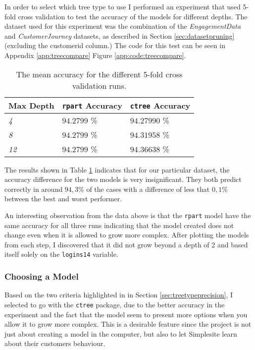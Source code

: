 In order to select which tree type to use I performed an experiment that used
5-fold cross validation\cite[p. 32]{bishop2006pattern} to test the accuracy of
the models for different depths. The dataset used for this experiment was the
combination of the \textit{EngagementData} and \textit{CustomerJourney}
datasets, as described in Section \ref{sec:datasetpruning} (excluding the
customerid column.) The code for this test can be seen in Appendix
\ref{app:treecompare} Figure \ref{app:code:treecompare}.

\begin{table}[H]
    \centering
    \begin{tabular}{l|l|l}
        \textbf{Max Depth} & \textbf{\texttt{rpart} Accuracy} & \textbf{\texttt{ctree} Accuracy} \\ \hline
        \textit{4}         & $94.2799$ \%                     & $94.27990$ \%                    \\
        \textit{8}         & $94.2799$ \%                     & $94.31958$ \%                    \\
        \textit{12}        & $94.2799$ \%                     & $94.36638$ \%
    \end{tabular}
    \caption{The mean accuracy for the different 5-fold cross validation runs.}
    \label{tab:treecompare}
\end{table}

The results shown in Table \ref{tab:treecompare} indicates that for our
particular dataset, the accuracy difference for the two models is very
insignificant. They both predict correctly in around $94,3\%$ of the cases with
a difference of less that $0,1\%$ between the best and worst performer.

An interesting observation from the data above is that the \texttt{rpart} model
have the same accuracy for all three runs indicating that the model created does
not change even when it is allowed to grow more complex. After plotting the
models from each step, I discovered that it did not grow beyond a depth of 2 and
based itself solely on the \texttt{logins14} variable.


\subsubsection{Choosing a Model}

Based on the two criteria highlighted in in Section \ref{sec:treetypeprecision},
I selected to go with the \texttt{ctree} package, due to the better accuracy in
the experiment and the fact that the model seem to present more options when you
allow it to grow more complex. This is a desirable feature since the project is
not just about creating a model in the computer, but also to let Simplesite
learn about their customers behaviour.

